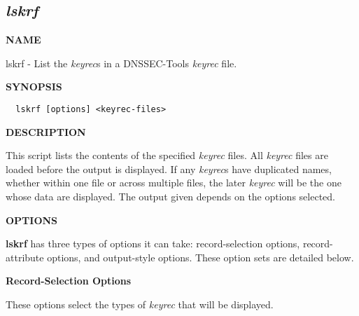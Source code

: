 \clearpage

\subsection{{\it lskrf}}


{\bf NAME}

lskrf - List the {\it keyrec}s in a DNSSEC-Tools {\it keyrec} file.

{\bf SYNOPSIS}

\begin{verbatim}  lskrf [options] <keyrec-files>\end{verbatim}

{\bf DESCRIPTION}

This script lists the contents of the specified {\it keyrec} files.  All {\it
keyrec} files are loaded before the output is displayed.  If any {\it keyrec}s
have duplicated names, whether within one file or across multiple files, the
later {\it keyrec} will be the one whose data are displayed.  The output given
depends on the options selected.

{\bf OPTIONS}

{\bf lskrf} has three types of options it can take:  record-selection options,
record-attribute options, and output-style options.  These option sets are
detailed below.

{\bf Record-Selection Options}

These options select the types of {\it keyrec} that will be displayed.

